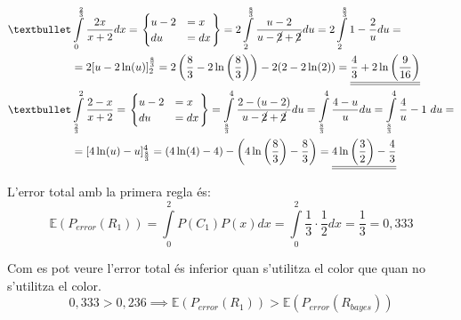 \documentclass[a4paper]{article}
\begin{document}
\begin{align*}
\textbullet 
&\int\limits_{0}^{\frac{2}{3}} \frac{2x}{x + 2} dx =
\begin{rcases}
\begin{cases}
u - 2 &= x  \\
du &= dx
\end{cases}
\end{rcases} =
2 \int\limits_{2}^{\frac{8}{3}} \frac{u - 2}{u - \cancel{2} + \cancel{2}} du = 
2 \int\limits_{2}^{\frac{8}{3}}  1 -\frac{2}{u} du = \\
&= 2 [u - 2\ln(u)]_2^{\frac{8}{3}} = 
2 \left( \frac{8}{3} - 2\ln\left( \frac{8}{3} \right) \right) - 2 (2 - 2\ln(2)) =
\underline{\underline{\frac{4}{3} + 2\ln\left(\frac{9}{16}\right)}} \\
\textbullet & 
\int\limits_{\frac{2}{3}}^{2} \frac{2 - x}{x + 2} = 
\begin{rcases}
\begin{cases}
u - 2 &= x  \\
du &= dx
\end{cases}
\end{rcases} =
\int\limits_{\frac{8}{3}}^4 \frac{2 - (u - 2)}{u - \cancel{2} + \cancel{2}} du =
\int\limits_{\frac{8}{3}}^4 \frac{4 - u}{u} du =
\int\limits_{\frac{8}{3}}^4 \frac{4}{u} - 1 \ du = \\
&= [4\ln(u) - u]_{\frac{8}{3}}^4 = 
(4\ln(4) - 4) - \left( 4\ln\left( \frac{8}{3}\right) - \frac{8}{3} \right) =
\underline{\underline{4\ln\left(\frac{3}{2} \right)- \frac{4}{3}}}
\end{align*}

L'error total amb la primera regla és:
$$
\mathbb{E}(P_{error}(R_1)) = \int\limits_{0}^{2} P(C_1)P(x)dx = 
\int\limits_{0}^{2}\frac{1}{3}·\frac{1}{2}dx = \boxed{\frac{1}{3} = 0,333}
$$

Com es pot veure l'error total és inferior quan s'utilitza el color que quan no s'utilitza el color.
$$
0,333 > 0,236 \implies 
\mathbb{E}(P_{error}(R_1)) > \mathbb{E}(P_{error}(R_{bayes}))
$$
\end{document}
